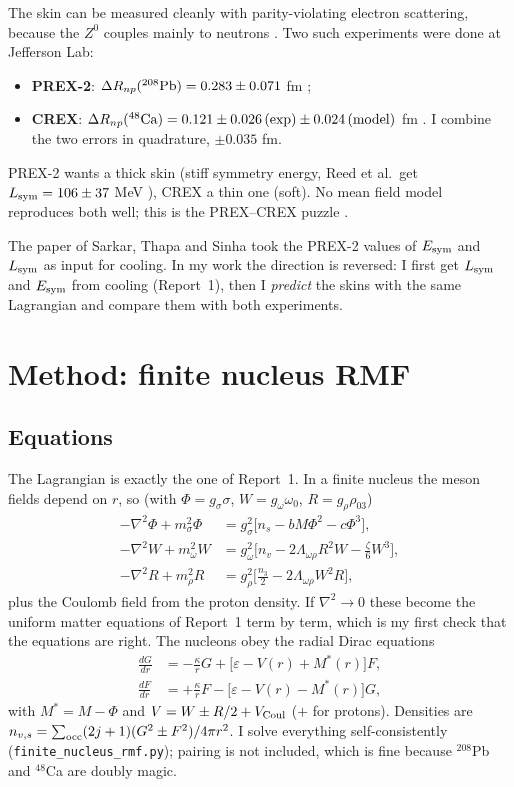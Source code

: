 \documentclass[11pt,a4paper]{article}
\newcommand{\Esym}{E_{\rm sym}}
\newcommand{\Lsym}{L_{\rm sym}}
\newcommand{\DRnp}{\Delta R_{np}}
\begin{document}
The skin can be measured cleanly with parity-violating electron scattering, because the $Z^0$ couples mainly to neutrons \cite{Horowitz2001PV}. Two such experiments were done at Jefferson Lab:
\begin{itemize}
\item \textbf{PREX-2}: $\DRnp(^{208}{\rm Pb})=0.283\pm0.071$ fm \cite{PREX2};
\item \textbf{CREX}: $\DRnp(^{48}{\rm Ca})=0.121\pm0.026\,({\rm exp})\pm0.024\,({\rm model})$ fm \cite{CREX}. I combine the two errors in quadrature, $\pm0.035$ fm.
\end{itemize}
PREX-2 wants a thick skin (stiff symmetry energy, Reed et al.\ get $\Lsym=106\pm37$ MeV \cite{Reed2021}), CREX a thin one (soft). No mean field model reproduces both well; this is the PREX--CREX puzzle \cite{Reinhard2022}.

The paper of Sarkar, Thapa and Sinha \cite{Sarkar2023} took the PREX-2 values of $\Esym$ and $\Lsym$ as input for cooling. In my work the direction is reversed: I first get $\Lsym$ and $\Esym$ from cooling (Report~1), then I \emph{predict} the skins with the same Lagrangian and compare them with both experiments.

\section{Method: finite nucleus RMF}
\subsection{Equations}
The Lagrangian is exactly the one of Report~1. In a finite nucleus the meson fields depend on $r$, so (with $\Phi=g_\sigma\sigma$, $W=g_\omega\omega_0$, $R=g_\rho\rho_{03}$)
\begin{align}
-\nabla^2\Phi + m_\sigma^2\Phi &= g_\sigma^2\big[n_s - bM\Phi^2 - c\Phi^3\big],\\
-\nabla^2W + m_\omega^2W &= g_\omega^2\big[n_v - 2\Lambda_{\omega\rho}R^2W - \tfrac{\zeta}{6}W^3\big],\\
-\nabla^2R + m_\rho^2R &= g_\rho^2\big[\tfrac{n_3}{2} - 2\Lambda_{\omega\rho}W^2R\big],
\end{align}
plus the Coulomb field from the proton density. If $\nabla^2\to0$ these become the uniform matter equations of Report~1 term by term, which is my first check that the equations are right. The nucleons obey the radial Dirac equations \cite{HorowitzSerot1981}
\begin{align}
\frac{dG}{dr} &= -\frac{\kappa}{r}G + \big[\varepsilon - V(r) + M^*(r)\big]F,\\
\frac{dF}{dr} &= +\frac{\kappa}{r}F - \big[\varepsilon - V(r) - M^*(r)\big]G,
\end{align}
with $M^*=M-\Phi$ and $V=W\pm R/2+V_{\rm Coul}$ ($+$ for protons). Densities are $n_{v,s}=\sum_{\rm occ}(2j+1)(G^2\pm F^2)/4\pi r^2$. I solve everything self-consistently (\texttt{finite\_nucleus\_rmf.py}); pairing is not included, which is fine because $^{208}$Pb and $^{48}$Ca are doubly magic.
\end{document}
